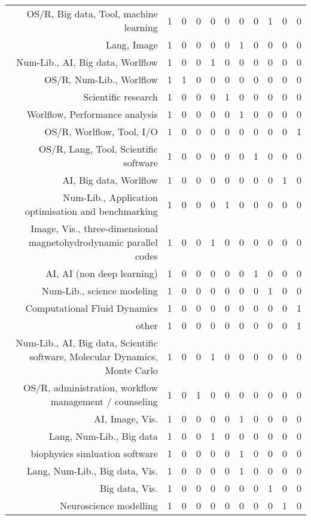 {\begin{landscape}
\begin{longtable}[htb]{r|c|c|c|c|c|c|c|c|c|c}
{OS/R, Big data, Tool, machine learning} & 1 & 0 & 0 & 0 & 0 & 0 & 0 & 1 & 0 & 0 \\%
{Lang, Image} & 1 & 0 & 0 & 0 & 0 & 1 & 0 & 0 & 0 & 0 \\%
{Num-Lib., AI, Big data, Worlflow} & 1 & 0 & 0 & 1 & 0 & 0 & 0 & 0 & 0 & 0 \\%
{OS/R, Num-Lib., Worlflow} & 1 & 1 & 0 & 0 & 0 & 0 & 0 & 0 & 0 & 0 \\%
{Scientific research} & 1 & 0 & 0 & 0 & 1 & 0 & 0 & 0 & 0 & 0 \\%
{Worlflow, Performance analysis} & 1 & 0 & 0 & 0 & 0 & 1 & 0 & 0 & 0 & 0 \\%
{OS/R, Worlflow, Tool, I/O} & 1 & 0 & 0 & 0 & 0 & 0 & 0 & 0 & 0 & 1 \\%
{OS/R, Lang, Tool, Scientific software} & 1 & 0 & 0 & 0 & 0 & 0 & 1 & 0 & 0 & 0 \\%
{AI, Big data, Worlflow} & 1 & 0 & 0 & 0 & 0 & 0 & 0 & 0 & 1 & 0 \\%
{Num-Lib., Application optimisation and benchmarking} & 1 & 0 & 0 & 0 & 1 & 0 & 0 & 0 & 0 & 0 \\%
{Image, Vis., three-dimensional magnetohydrodynamic parallel codes} & 1 & 0 & 0 & 1 & 0 & 0 & 0 & 0 & 0 & 0 \\%
{AI, AI (non deep learning)} & 1 & 0 & 0 & 0 & 0 & 0 & 1 & 0 & 0 & 0 \\%
{Num-Lib., science modeling} & 1 & 0 & 0 & 0 & 0 & 0 & 0 & 1 & 0 & 0 \\%
{Computational Fluid Dynamics} & 1 & 0 & 0 & 0 & 0 & 0 & 0 & 0 & 0 & 1 \\%
{other} & 1 & 0 & 0 & 0 & 0 & 0 & 0 & 0 & 0 & 1 \\%
{Num-Lib., AI, Big data, Scientific software, Molecular Dynamics, Monte Carlo} & 1 & 0 & 0 & 1 & 0 & 0 & 0 & 0 & 0 & 0 \\%
{OS/R, administration, workflow management / counseling} & 1 & 0 & 1 & 0 & 0 & 0 & 0 & 0 & 0 & 0 \\%
{AI, Image, Vis.} & 1 & 0 & 0 & 0 & 0 & 1 & 0 & 0 & 0 & 0 \\%
{Lang, Num-Lib., Big data} & 1 & 0 & 0 & 1 & 0 & 0 & 0 & 0 & 0 & 0 \\%
{biophysics simluation software} & 1 & 0 & 0 & 0 & 0 & 1 & 0 & 0 & 0 & 0 \\%
{Lang, Num-Lib., Big data, Vis.} & 1 & 0 & 0 & 0 & 0 & 1 & 0 & 0 & 0 & 0 \\%
{Big data, Vis.} & 1 & 0 & 0 & 0 & 0 & 0 & 0 & 1 & 0 & 0 \\%
{Neuroscience modelling} & 1 & 0 & 0 & 0 & 0 & 0 & 0 & 0 & 1 & 0 \\%

\end{longtable}
\end{landscape}}
